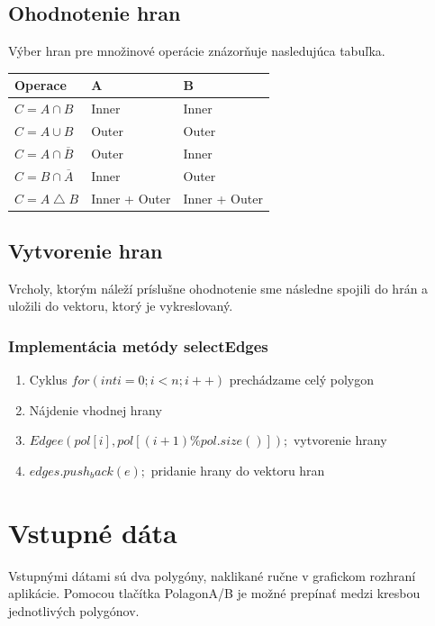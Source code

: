 \documentclass[12pt]{article}
\begin{document}
\subsection {Ohodnotenie hran}
Výber hran pre množinové operácie znázorňuje nasledujúca tabuľka.

\begin{table}[h]
	\begin{tabular}{|l|l|l|}
		\hline
		Operace & A             & B             \\ \hline \hline
		$C = A\cap B$  & Inner         & Inner         \\ \hline
		$C = A\cup B$  & Outer         & Outer         \\ \hline
		$C = A\cap \overline{B}$  & Outer         & Inner         \\ \hline
		$C = B\cap \overline{A}$  & Inner         & Outer         \\ \hline
		$C = A\bigtriangleup B$  & Inner + Outer & Inner + Outer \\ \hline
	\end{tabular}
\end{table}

\subsection {Vytvorenie hran}
Vrcholy, ktorým náleží príslušne ohodnotenie sme následne spojili do hrán a uložili do vektoru, ktorý je vykreslovaný.

\subsubsection{Implementácia metódy selectEdges}
\begin{enumerate}
\item Cyklus $ for(int i = 0; i < n; i++)$  prechádzame celý polygon
\item Nájdenie vhodnej hrany
\item \hspace {1.0cm} $Edge e (pol[i], pol[(i+1)\%pol.size()]);$ vytvorenie hrany
\item \hspace {1.0cm} $edges.push_back(e);$ pridanie hrany do vektoru hran
\end{enumerate}
\clearpage 
\section{Vstupné dáta}
Vstupnými dátami sú dva polygóny, naklikané ručne v grafickom rozhraní aplikácie. Pomocou tlačítka PolagonA/B je možné prepínať medzi kresbou jednotlivých polygónov.
\end{document}
